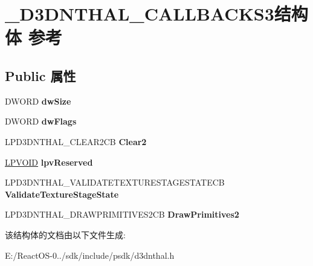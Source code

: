 \hypertarget{struct___d3_d_n_t_h_a_l___c_a_l_l_b_a_c_k_s3}{}\section{\+\_\+\+D3\+D\+N\+T\+H\+A\+L\+\_\+\+C\+A\+L\+L\+B\+A\+C\+K\+S3结构体 参考}
\label{struct___d3_d_n_t_h_a_l___c_a_l_l_b_a_c_k_s3}
\subsection*{Public 属性}
\begin{DoxyCompactItemize}
\item 
\mbox{\label{struct___d3_d_n_t_h_a_l___c_a_l_l_b_a_c_k_s3_a58f24d7b1f4e5a91ec692f3092d929e4}} 
D\+W\+O\+RD {\bfseries dw\+Size}
\item 
\mbox{\label{struct___d3_d_n_t_h_a_l___c_a_l_l_b_a_c_k_s3_a8d6e6a62503a0615d39bf09a8ec84d70}} 
D\+W\+O\+RD {\bfseries dw\+Flags}
\item 
\mbox{\label{struct___d3_d_n_t_h_a_l___c_a_l_l_b_a_c_k_s3_a59d3b031e8c7306f35732772f6dafc6c}} 
L\+P\+D3\+D\+N\+T\+H\+A\+L\+\_\+\+C\+L\+E\+A\+R2\+CB {\bfseries Clear2}
\item 
\mbox{\label{struct___d3_d_n_t_h_a_l___c_a_l_l_b_a_c_k_s3_aa21471d9a061ba7aeb4b09a725ba6326}} 
\hyperlink{interfacevoid}{L\+P\+V\+O\+ID} {\bfseries lpv\+Reserved}
\item 
\mbox{\label{struct___d3_d_n_t_h_a_l___c_a_l_l_b_a_c_k_s3_a708fbcbbb393d09156d7ef574c98fa86}} 
L\+P\+D3\+D\+N\+T\+H\+A\+L\+\_\+\+V\+A\+L\+I\+D\+A\+T\+E\+T\+E\+X\+T\+U\+R\+E\+S\+T\+A\+G\+E\+S\+T\+A\+T\+E\+CB {\bfseries Validate\+Texture\+Stage\+State}
\item 
\mbox{\label{struct___d3_d_n_t_h_a_l___c_a_l_l_b_a_c_k_s3_af5929c9d92d5745d75e0c2adbf922e02}} 
L\+P\+D3\+D\+N\+T\+H\+A\+L\+\_\+\+D\+R\+A\+W\+P\+R\+I\+M\+I\+T\+I\+V\+E\+S2\+CB {\bfseries Draw\+Primitives2}
\end{DoxyCompactItemize}


该结构体的文档由以下文件生成\+:\begin{DoxyCompactItemize}
\item 
E\+:/\+React\+O\+S-\/0../sdk/include/psdk/d3dnthal.\+h\end{DoxyCompactItemize}
